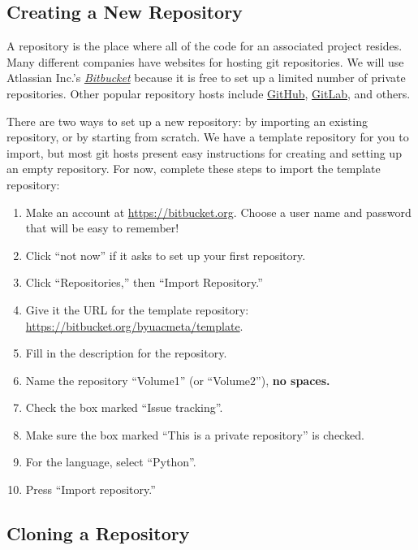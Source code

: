 \subsection*{Creating a New Repository} %

A repository is the place where all of the code for an associated project resides.
Many different companies have websites for hosting git repositories.
We will use Atlassian Inc.'s \href{https://bitbucket.org/}{\emph{Bitbucket}} because it is free to set up a limited number of private repositories.
Other popular repository hosts include \href{https://github.com/}{GitHub}, \href{https://gitlab.com/}{GitLab}, and others.

There are two ways to set up a new repository: by importing an existing repository, or by starting from scratch.
We have a template repository for you to import, but most git hosts present easy instructions for creating and setting up an empty repository.
For now, complete these steps to import the template repository:

\begin{enumerate}
\item Make an account at \url{https://bitbucket.org}.
Choose a user name and password that will be easy to remember!
\item Click ``not now'' if it asks to set up your first repository.
\item Click ``Repositories,'' then ``Import Repository.''
\item Give it the URL for the template repository: \url{https://bitbucket.org/byuacmeta/template}. %
\item Fill in the description for the repository.
\item Name the repository ``Volume1'' (or ``Volume2''), \textbf{no spaces.}
\item Check the box marked ``Issue tracking''.
\item Make sure the box marked ``This is a private repository'' is checked.
\item For the language, select ``Python''.
\item Press ``Import repository.''
\end{enumerate}

\subsection*{Cloning a Repository} %

